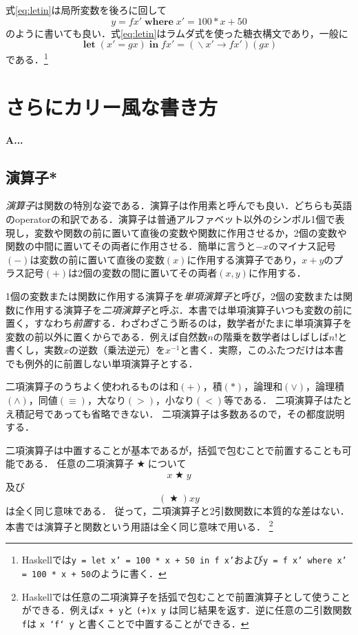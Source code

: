 \documentclass[twocolumn]{jsbook}
\newcommand{\keyword}[1]{{\emph{#1}}}
\newcommand{\code}[1]{\texttt{#1}}
\newenvironment{leader}{\begingroup\bf}{\endgroup}
\newcommand{\mathKeyword}[1]{\mathbf{#1}}
\DeclareMathOperator{\mathAnyBinaryOperator}{\bigstar}
\DeclareMathOperator{\mathLambda}{\backslash}
\DeclareMathOperator{\mathLet}{\mathKeyword{let}}
\DeclareMathOperator{\mathLetIn}{\mathKeyword{in}}
\DeclareMathOperator{\mathWhere}{\mathKeyword{where}}
\newcommand{\mathLambdaArrow}{\rightarrow}
\newcommand{\mathLambdaExpression}[2]{\mathLambda#1\mathLambdaArrow#2}
\begin{document}
式\eqref{eq:letin}は局所変数を後ろに回して$$y=fx'\mathWhere x'=100*x+50$$のように書いても良い．式\eqref{eq:letin}はラムダ式を使った糖衣構文であり，一般に$$\mathLet(x'=gx)\mathLetIn fx'=(\mathLambdaExpression{x'}{fx'})(gx)$$である．\footnote{Haskellでは\code{y = let x' = 100 * x + 50 in f x'}および\code{y = f x' where x' = 100 * x + 50}のように書く．}


\chapter{さらにカリー風な書き方}

\begin{leader}
A...
\end{leader}


\section{演算子*}

\keyword{演算子}は関数の特別な姿である．演算子は作用素と呼んでも良い．どちらも英語のoperatorの和訳である．演算子は普通アルファベット以外のシンボル1個で表現し，変数や関数の前に置いて直後の変数や関数に作用させるか，2個の変数や関数の中間に置いてその両者に作用させる．簡単に言うと$-x$のマイナス記号$(-)$は変数の前に置いて直後の変数$(x)$に作用する演算子であり，$x+y$のプラス記号$(+)$は2個の変数の間に置いてその両者$(x,y)$に作用する．

1個の変数または関数に作用する演算子を\keyword{単項演算子}と呼び，2個の変数または関数に作用する演算子を\keyword{二項演算子}と呼ぶ．本書では単項演算子いつも変数の前に置く，すなわち\keyword{前置}する．わざわざこう断るのは，数学者がたまに単項演算子を変数の前以外に置くからである．例えば自然数$n$の階乗を数学者はしばしば$n!$と書くし，実数$x$の逆数（乗法逆元）を$x^{-1}$と書く．実際，このふたつだけは本書でも例外的に前置しない単項演算子とする．

二項演算子のうちよく使われるものは和$(+)$，積$(*)$，論理和$(\vee)$，論理積$(\wedge)$，同値$(\equiv)$，大なり$(>)$，小なり$(<)$等である．
二項演算子はたとえ積記号であっても省略できない．
二項演算子は多数あるので，その都度説明する．

二項演算子は中置することが基本であるが，括弧で包むことで前置することも可能である．
任意の二項演算子$\mathAnyBinaryOperator$について$$x\mathAnyBinaryOperator y$$及び$$(\mathAnyBinaryOperator)xy$$は全く同じ意味である．
従って，二項演算子と2引数関数に本質的な差はない．
本書では演算子と関数という用語は全く同じ意味で用いる．
\footnote{Haskellでは任意の二項演算子を括弧で包むことで前置演算子として使うことができる．例えば\code{x + y}と \code{(+)x y} は同じ結果を返す．逆に任意の二引数関数\code{f}は \code{x `f` y} と書くことで中置することができる．}
\end{document}
